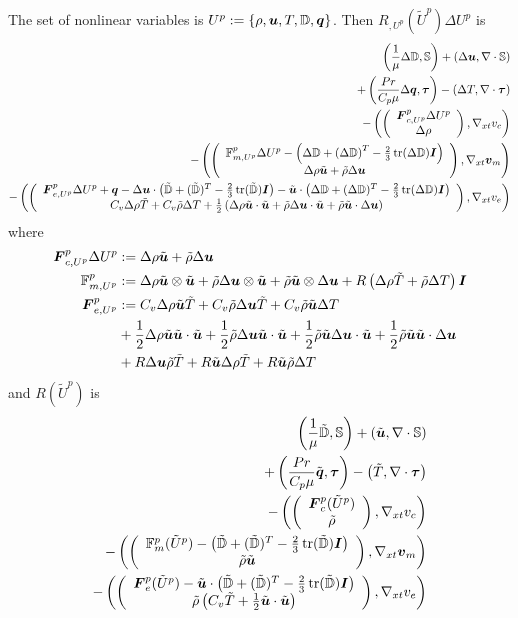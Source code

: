 \documentclass{article}
\begin{document}
The set of nonlinear variables is $U^p:=\left\{ \rho,\boldsymbol u,T,\mathbb{D},\boldsymbol q \right\}$.
Then $R_{,U^p}(\tilde U^p)\Delta U^p$ is
\begin{align*}
	\left( \frac{1}{\mu}\Delta\mathbb{D},\mathbb{S} \right)+\left( \Delta\boldsymbol u,\nabla\cdot\mathbb{S} \right)\\
	+\left( \frac{Pr}{C_p\mu}\Delta\boldsymbol q,\boldsymbol\tau \right)-\left( \Delta T,\nabla\cdot\boldsymbol\tau \right)\\
	-\left( \left( \begin{array}{c} \boldsymbol F^p_{c,U^p}\Delta U^p\\ \Delta\rho\\ \end{array} \right),\nabla_{xt} v_c \right)\\
	-\left( \left( \begin{array}{c} \mathbb{F}^p_{m,U^p}\Delta U^p-\left( \Delta\mathbb{D}+\left( \Delta\mathbb{D} \right)^T-\frac{2}{3}\operatorname*{tr}(\Delta\mathbb{D})\boldsymbol I \right)\\ \Delta\rho\tilde{\boldsymbol u}+\tilde\rho\Delta\boldsymbol u\\ \end{array} \right),\nabla_{xt}\boldsymbol v_m \right)\\
	-\left( \left( \begin{array}{c} \boldsymbol F^p_{e,U^p}\Delta U^p+\boldsymbol q-\Delta\boldsymbol u\cdot\left( \tilde{\mathbb{D}}+(\tilde{\mathbb{D}})^T-\frac{2}{3}\operatorname*{tr}(\tilde{\mathbb{D}})\boldsymbol I \right)
	-\tilde{\boldsymbol u}\cdot\left( \Delta\mathbb{D}+(\Delta\mathbb{D})^T-\frac{2}{3}\operatorname*{tr}(\Delta\mathbb{D})\boldsymbol I \right)\\ C_v\Delta\rho\tilde T+C_v\tilde\rho\Delta T
	+\frac{1}{2}\left( \Delta\rho\tilde{\boldsymbol u}\cdot\tilde{\boldsymbol u}+\tilde\rho\Delta\boldsymbol u\cdot\tilde{\boldsymbol u}+\tilde\rho\tilde{\boldsymbol u}\cdot\Delta\boldsymbol u \right)\\ \end{array} \right),\nabla_{xt} v_e \right)
\end{align*}
where
\begin{align*}
\boldsymbol F^p_{c,U^p}\Delta U^p&:=\Delta\rho\tilde{\boldsymbol u}+\tilde\rho\Delta\boldsymbol u\\
\mathbb{F}^p_{m,U^p}&:=\Delta\rho\tilde{\boldsymbol u}\otimes\tilde{\boldsymbol u}+\tilde\rho\Delta\boldsymbol u\otimes\tilde{\boldsymbol u}+\tilde\rho\tilde{\boldsymbol u}\otimes\Delta\boldsymbol u
+R\left( \Delta\rho\tilde T+\tilde\rho\Delta T \right)\boldsymbol I\\
\boldsymbol F^p_{e,U^p}&:=C_v\Delta\rho\tilde{\boldsymbol u}\tilde T+C_v\tilde\rho\Delta\boldsymbol u\tilde T+C_v\tilde\rho\tilde{\boldsymbol u}\Delta T\\
&+\frac{1}{2}\Delta\rho\tilde{\boldsymbol u}\tilde{\boldsymbol u}\cdot\tilde{\boldsymbol u}
+\frac{1}{2}\tilde\rho\Delta\boldsymbol u\tilde{\boldsymbol u}\cdot\tilde{\boldsymbol u}
+\frac{1}{2}\tilde\rho\tilde{\boldsymbol u}\Delta\boldsymbol u\cdot\tilde{\boldsymbol u}
+\frac{1}{2}\tilde\rho\tilde{\boldsymbol u}\tilde{\boldsymbol u}\cdot\Delta\boldsymbol u\\
&+R\Delta\boldsymbol u\tilde\rho\tilde T
+R\tilde{\boldsymbol u}\Delta\rho\tilde T
+R\tilde{\boldsymbol u}\tilde\rho\Delta T
\end{align*}
and $R(\tilde U^p)$ is
\begin{align*}
	\left( \frac{1}{\mu}\tilde{\mathbb{D}},\mathbb{S} \right)+\left( \tilde{\boldsymbol u},\nabla\cdot\mathbb{S} \right)\\
	+\left( \frac{Pr}{C_p\mu}\tilde{\boldsymbol q},\boldsymbol\tau \right)-\left( \tilde T,\nabla\cdot\boldsymbol\tau \right)\\
	-\left( \left( \begin{array}{c} \boldsymbol F^p_c(\tilde U^p)\\ \tilde\rho\\ \end{array} \right),\nabla_{xt} v_c \right)\\
	-\left( \left( \begin{array}{c} \mathbb{F}^p_m(\tilde U^p)-\left( \tilde{\mathbb{D}}+(\tilde{\mathbb{D}})^T-\frac{2}{3}\operatorname*{tr}(\tilde{\mathbb{D}})\boldsymbol I \right)\\ \tilde\rho\tilde{\boldsymbol u}\\ \end{array} \right),\nabla_{xt}\boldsymbol v_m \right)\\
	-\left( \left( \begin{array}{c} \boldsymbol F^p_e(\tilde U^p)-\tilde{\boldsymbol u}\cdot\left( \tilde{\mathbb{D}}+(\tilde{\mathbb{D}})^T-\frac{2}{3}\operatorname*{tr}(\tilde{\mathbb{D}})\boldsymbol I \right)\\ \tilde\rho\left( C_v\tilde T+\frac{1}{2}\tilde{\boldsymbol u}\cdot\tilde{\boldsymbol u} \right)\\ \end{array} \right),\nabla_{xt} v_e \right)
\end{align*}
\end{document}
